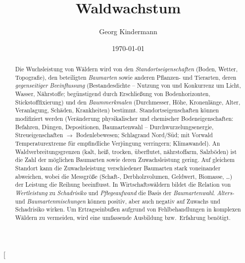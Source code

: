 \documentclass[twocolumn, paper=a4, fontsize=10pt]{scrartcl}
\begin{document}
\title{Waldwachstum}
\author{Georg Kindermann}
\date{\today}

\twocolumn[
  \begin{@twocolumnfalse}
    \maketitle
    
    {\centering\Large\abstractname\par}
    \vspace{1ex}
    
    \begin{abstract}
      Die Wuchsleistung von Wäldern wird von den \emph{Standortseigenschaften} (Boden, Wetter, Topografie), den beteiligten \emph{Baumarten} sowie anderen Pflanzen- und Tierarten, deren \emph{gegenseitiger Beeinflussung} (Bestandesdichte -- Nutzung von und Konkurrenz um Licht, Wasser, Nährstoffe; begünstigend durch Erschließung von Bodenhorizonten, Stickstofffixierung) und den \emph{Baummerkmalen} (Durchmesser, Höhe, Kronenlänge, Alter, Veranlagung, Schäden, Krankheiten) bestimmt. Standortseigenschaften können modifiziert werden (Veränderung physikalischer und chemischer Bodeneigenschaften: Befahren, Düngen, Depositionen, Baumartenwahl – Durchwurzelungsenergie, Streueigenschaften $\rightarrow$ Bodenlebewesen; Schlagrand Nord/Süd; mit Vorwald Temperaturextreme für empfindliche Verjüngung verringern; Klimawandel). An Waldverbreitungsgrenzen (kalt, heiß, trocken, überflutet, nährstoffarm, Salzböden) ist die Zahl der möglichen Baumarten sowie deren Zuwachsleistung gering. Auf gleichem Standort kann die Zuwachsleistung verschiedener Baumarten stark voneinander abweichen, wobei die Messgröße (Schaft-, Derbholzvolumen, Geldwert, Biomasse, \dots) der Leistung die Reihung beeinflusst. In Wirtschaftswäldern bildet die Relation von \emph{Wertleistung} zu \emph{Schadrisiko} und \emph{Pflegeaufwand} die Basis der \emph{Baumartenwahl}. \emph{Alters-} und \emph{Baumartenmischungen} können positiv, aber auch negativ auf Zuwachs und Schadrisiko wirken. Um Ertragseinbußen aufgrund von Fehlbehandlungen in komplexen Wäldern zu vermeiden, wird eine umfassende Ausbildung bzw.\ Erfahrung benötigt.


\end{abstract}
\end{@twocolumnfalse}
\end{document}
